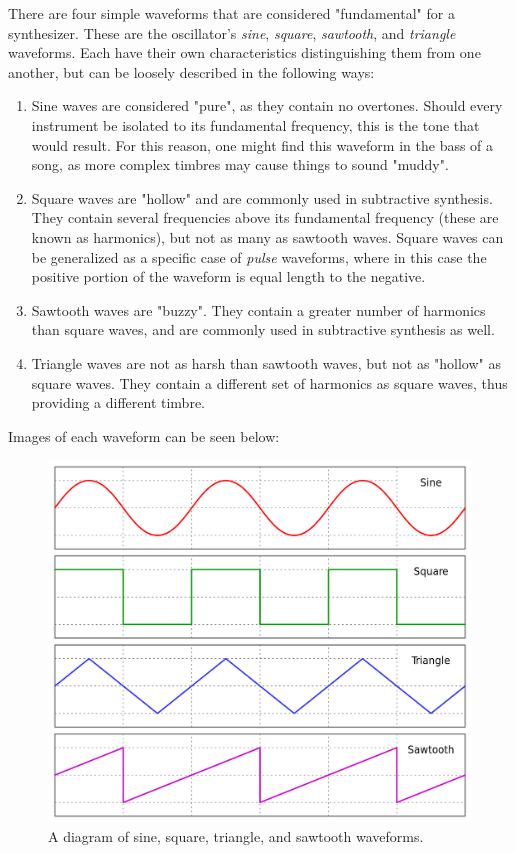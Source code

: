 \documentclass[12pt]{article}
\begin{document}
There are four simple waveforms that are considered "fundamental" for a synthesizer. These are the oscillator's \textit{sine}, \textit{square}, \textit{sawtooth}, and \textit{triangle} waveforms. Each have their own characteristics distinguishing them from one another, but can be loosely described in the following ways:

\begin{enumerate}
	\item Sine waves are considered "pure", as they contain no overtones. Should every instrument be isolated to its fundamental frequency, this is the tone that would result. For this reason, one might find this waveform in the bass of a song, as more complex timbres may cause things to sound "muddy".
	\item Square waves are "hollow" and are commonly used in subtractive synthesis. They contain several frequencies above its fundamental frequency (these are known as harmonics), but not as many as sawtooth waves. Square waves can be generalized as a specific case of \textit{pulse} waveforms, where in this case the positive portion of the waveform is equal length to the negative.
	\item Sawtooth waves are "buzzy". They contain a greater number of harmonics than square waves, and are commonly used in subtractive synthesis as well.
	\item Triangle waves are not as harsh than sawtooth waves, but not as "hollow" as square waves. They contain a different set of harmonics as square waves, thus providing a different timbre.
\end{enumerate}

Images of each waveform can be seen below:

\begin{figure}[h]
	\centering
	\includegraphics[scale=0.25]{Waveforms.png}
	\caption{A diagram of sine, square, triangle, and sawtooth waveforms.}
\end{figure}
\end{document}
